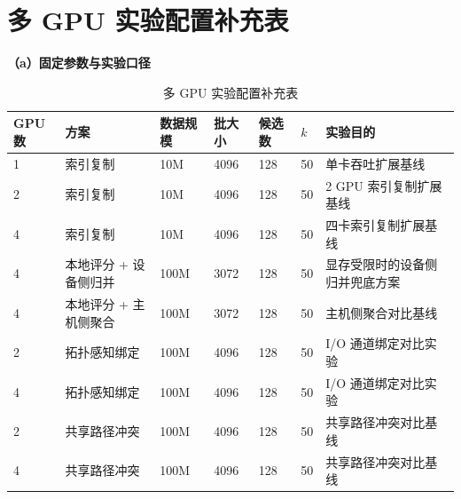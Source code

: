 \Needspace{0.95\textheight}
\section{多 GPU 实验配置补充表}

\begin{table}[!htbp]
  \caption{多 GPU 实验配置补充表}
  \label{tab:multi-gpu-exp-setup}
  \centering
  \small
  \setlength{\tabcolsep}{3pt}
  \renewcommand{\arraystretch}{1.10}
  \textbf{（a）固定参数与实验口径}
  \begin{adjustbox}{max width=\linewidth}
    \begin{tabular}{C{0.9cm}P{3.1cm}C{1.2cm}C{1.2cm}C{1.2cm}C{0.8cm}P{4.3cm}}
      \toprule
      GPU数 & 方案 & 数据规模 & 批大小 & 候选数 & $k$ & 实验目的 \\
       & 索引复制 & 10M & 4096 & 128 & 50 & 单卡吞吐扩展基线 \\
      2 & 索引复制 & 10M & 4096 & 128 & 50 & 2 GPU 索引复制扩展基线 \\
      4 & 索引复制 & 10M & 4096 & 128 & 50 & 四卡索引复制扩展基线 \\
      4 & 本地评分 + 设备侧归并 & 100M & 3072 & 128 & 50 & 显存受限时的设备侧归并兜底方案 \\
      4 & 本地评分 + 主机侧聚合 & 100M & 3072 & 128 & 50 & 主机侧聚合对比基线 \\
      2 & 拓扑感知绑定 & 100M & 4096 & 128 & 50 & I/O 通道绑定对比实验 \\
      4 & 拓扑感知绑定 & 100M & 4096 & 128 & 50 & I/O 通道绑定对比实验 \\
      2 & 共享路径冲突 & 100M & 4096 & 128 & 50 & 共享路径冲突对比基线 \\
      4 & 共享路径冲突 & 100M & 4096 & 128 & 50 & 共享路径冲突对比基线 \\
      \bottomrule
    \end{tabular}
  \end{adjustbox}


\end{table}
